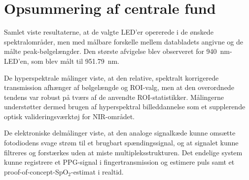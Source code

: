 \section{Opsummering af centrale fund}
Samlet viste resultaterne, at de valgte LED'er opererede i de ønskede spektralområder, men med målbare forskelle mellem databladets angivne og de målte peak-bølgelængder. Den største afvigelse blev observeret for \SI{940}{nm}-LED'en, som blev målt til \SI{951.79}{nm}.

De hyperspektrale målinger viste, at den relative, spektralt korrigerede transmission afhænger af bølgelængde og ROI-valg, men at den overordnede tendens var robust på tværs af de anvendte ROI-statistikker. Målingerne understøtter dermed brugen af hyperspektral billeddannelse som et supplerende optisk valideringsværktøj for NIR-området.

De elektroniske delmålinger viste, at den analoge signalkæde kunne omsætte fotodiodens svage strøm til et brugbart spændingssignal, og at signalet kunne filtreres og forstærkes uden at miste multipleksstrukturen. Det endelige system kunne registrere et PPG-signal i fingertransmission og estimere puls samt et proof-of-concept-SpO$_2$-estimat i realtid.
